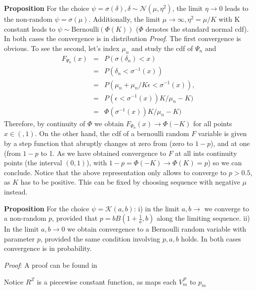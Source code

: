 \documentclass{article}
\begin{document}
\textbf{Proposition} For the choice $\psi=\sigma(\delta),\delta\sim\mathcal{N}(\mu,\eta^2)$, the limit $\eta\rightarrow 0$ leads to the non-random $\psi=\sigma(\mu)$. Additionally, the limit $\mu\rightarrow \infty, \eta^2=\mu/K$ with K constant leads to $\psi\sim \text{Bernoulli}(\Phi(K))$ ($\Phi$ denotes the standard normal cdf). In both cases the convergence is in distribution \textit{Proof}. The first convergence is obvious. To see the second, let's index $\mu_n$ and  study the cdf of $\Psi_n$ and 
\begin{align}F_{\Psi_n}(x)&=& P(\sigma(\delta_n)<x) \\
&=&P(\delta_n< \sigma^{-1}(x))\\
&=& P(\mu_n +\mu_n/K\epsilon <\sigma^{-1}(x)),\\\
&=& P( \epsilon <\sigma^{-1}(x))K/\mu_n -K)\\
&=& \Phi( \sigma^{-1}(x))K/\mu_n -K) 
\end{align}
Therefore, by continuity of $\Phi$ we obtain $F_{\Psi_n}(x)\rightarrow \Phi(-K)$ for all points $x\in(,1)$. On the other hand, the cdf of a bernoulli random $F$ variable is given by  a step function that abruptly changes at zero from (zero to $1-p$), and at one (from $1-p$ to 1. As we have obtained convergence to $F$ at all ints continuity points (the interval $(0,1)$), with $1-p= \Phi(-K)\rightarrow \Phi(K)=p$) so we can conclude. Notice that the above representation only allows   to converge to $p>0.5$, as $K$ has to be positive. This can be fixed by choosing sequence with negative $\mu$ instead.

\textbf{Proposition} For the choice $\psi=\mathcal{K}(a,b)$: i) in the limit $a,b \rightarrow $  we converge to a non-random $p$, provided that $p=bB\left(1+\frac{1}{a},b\right)$ along the limiting sequence. ii) In the limit $a,b\rightarrow 0$ we obtain convergence to a Bernoulli random variable with parameter $p$, provided the same condition involving $p,a,b$ holds. In both cases convergence is in probability.


\textit{Proof}: A proof can be found in \cite{mitnik2013kumar}



Notice $R^Z$ is a piecewise constant function, as maps each $V^\mathcal{P}_{m}$ to $p_m$
\end{document}
